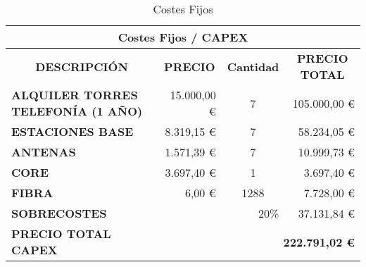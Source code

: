 \begin{table}[H]
\centering
\begin{tabular}{|lrcr|}
\hline
\multicolumn{4}{|c|}{\textbf{Costes Fijos / CAPEX}}                                                                                                                                           \\ \hline
\multicolumn{1}{|c|}{\textbf{DESCRIPCIÓN}}                       & \multicolumn{1}{c|}{\textbf{PRECIO}} & \multicolumn{1}{c|}{\textbf{Cantidad}} & \multicolumn{1}{c|}{\textbf{PRECIO TOTAL}} \\ \hline
\multicolumn{1}{|l|}{\textbf{ALQUILER TORRES TELEFONÍA (1 AÑO)}} & \multicolumn{1}{r|}{15.000,00 \euro}     & \multicolumn{1}{c|}{7}                 & 105.000,00 \euro                               \\ \hline
\multicolumn{1}{|l|}{\textbf{ESTACIONES BASE}}                   & \multicolumn{1}{r|}{8.319,15 \euro}      & \multicolumn{1}{c|}{7}                 & 58.234,05 \euro                                \\ \hline
\multicolumn{1}{|l|}{\textbf{ANTENAS}}                           & \multicolumn{1}{r|}{1.571,39 \euro}      & \multicolumn{1}{c|}{7}                 & 10.999,73 \euro                                \\ \hline
\multicolumn{1}{|l|}{\textbf{CORE}}                              & \multicolumn{1}{r|}{3.697,40 \euro}      & \multicolumn{1}{c|}{1}                 & 3.697,40 \euro                                 \\ \hline
\multicolumn{1}{|l|}{\textbf{FIBRA}}                             & \multicolumn{1}{r|}{6,00 \euro}          & \multicolumn{1}{c|}{1288}              & 7.728,00 \euro                                 \\ \hline
\multicolumn{1}{|l|}{\textbf{SOBRECOSTES}}                       & \multicolumn{2}{r|}{20\%}                                                     & 37.131,84 \euro                                \\ \hline
\multicolumn{1}{|l|}{\textbf{PRECIO TOTAL CAPEX}}                & \multicolumn{3}{r|}{\textbf{222.791,02 \euro}}                                                                                 \\ \hline
\end{tabular}
\caption{Costes Fijos}
\label{capex}
\end{table}

